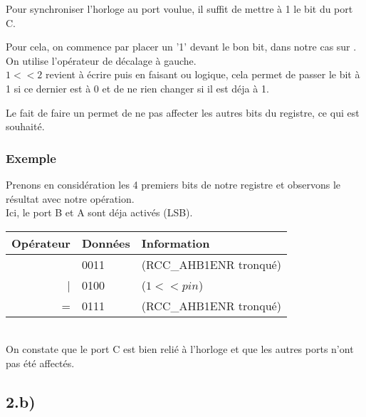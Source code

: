 Pour synchroniser l'horloge au port voulue, il suffit de mettre à 1 le bit du port C.

Pour cela, on commence par placer un '1' devant le bon bit, dans notre cas sur . On utilise l'opérateur de décalage à gauche.\\



$1 << 2$ revient à écrire  puis en faisant ou  logique, cela permet de passer le bit à 1 si ce dernier est à 0 et de ne rien changer si il est déja à 1.


Le fait de faire un  permet de ne pas affecter les autres bits du registre, ce qui est souhaité. 

\subsubsection{Exemple}
Prenons en considération les 4 premiers bits de notre registre  et observons le résultat avec notre opération.\\
Ici, le port B et A sont déja activés (LSB).\\

\begin{tabular}{rl|l}
  Opérateur & Données & Information \\
\hline
    & 0011 & (RCC\_AHB1ENR tronqué)\\
   | & 0100 & ($1 << pin$)\\
   \hline
   = & 0111 & (RCC\_AHB1ENR tronqué)\\
  
\end{tabular} \\

On constate que le port C est bien relié à l'horloge et que les autres ports n'ont pas été affectés.

\subsection{2.b)}

